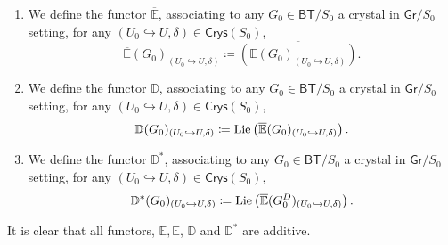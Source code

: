 \begin{defn}[]\leavevmode\vspace{-\baselineskip}
\begin{enumerate}
\item We define the functor $\overline{\mathbb{E}}$, associating to
	any $G_0 \in \mathsf{BT}/S_0$ a crystal in $\mathsf{Gr}/S_0$
	setting, for any $\left(U_0 \hookrightarrow U, \delta\right) \in \mathsf{Crys}(S_0)$,
	\begin{equation*}
		\overline{\mathbb{E}}(G_0)_{\left(U_0 \hookrightarrow U, \delta\right)} \coloneqq
		\overline{\left( \mathbb{E}(G_0)_{\left(U_0 \hookrightarrow U, \delta\right)} \right)}
	.\end{equation*}

\item We define the functor $\mathbb{D}$, associating to
	any $G_0 \in \mathsf{BT}/S_0$ a crystal in $\mathsf{Gr}/S_0$
	setting, for any $\left(U_0 \hookrightarrow U, \delta\right) \in \mathsf{Crys}(S_0)$,
	\begin{equation*}
		\mathbb{D}(G_0)_{\left(U_0 \hookrightarrow U, \delta\right)} \coloneqq
		\operatorname{Lie}
		\left( \overline{\mathbb{E}}(G_0)_{\left(U_0 \hookrightarrow U, \delta\right)} \right)
	.\end{equation*}

\item We define the functor $\mathbb{D}^*$, associating to
	any $G_0 \in \mathsf{BT}/S_0$ a crystal in $\mathsf{Gr}/S_0$
	setting, for any $\left(U_0 \hookrightarrow U, \delta\right) \in \mathsf{Crys}(S_0)$,
	\begin{equation*}
		\mathbb{D}^*(G_0)_{\left(U_0 \hookrightarrow U, \delta\right)} \coloneqq
		\operatorname{Lie}
		\left( \overline{\mathbb{E}}(G_0^D)_{\left(U_0 \hookrightarrow U, \delta\right)} \right)
	.\end{equation*}
\end{enumerate}
\end{defn}


\begin{rem}[]
	It is clear that all functors, $\mathbb{E}, \overline{\mathbb{E}}$,
	$\mathbb{D}$ and $\mathbb{D}^*$ are additive.
\end{rem}


